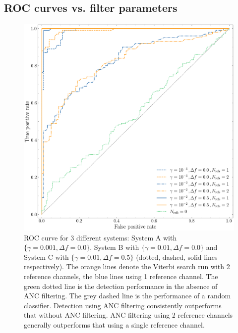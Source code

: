 \documentclass[pra,superscriptaddress,reprint,amsmath,amssymb,nofootinbib]{revtex4-2}
\begin{document}
\subsection{ROC curves vs. filter parameters} \label{sec:roc2}
\begin{figure}
	\begin{center}
		\includegraphics[width=\columnwidth]{images/4C_roccurve_multi_ref}
	\end{center}
	\caption{ROC curve for 3 different systems: System A with $\{ \gamma = 0.001, \Delta f = 0.0\}$, System B with $\{ \gamma = 0.01, \Delta f = 0.0\}$  and System C with $\{ \gamma = 0.01, \Delta f = 0.5\}$ (dotted, dashed, solid lines respectively). The orange lines denote the Viterbi search run with 2 reference channels, the blue lines using 1 reference channel. The green dotted line is the detection performance in the absence of ANC filtering. The grey dashed line is the performance of a random classifier. Detection using ANC filtering consistently outperforms that without ANC filtering. ANC filtering using 2 reference channels generally outperforms that using a single reference channel.}
	\label{fig:4C_roccurve_multi_ref}
\end{figure}
\end{document}
